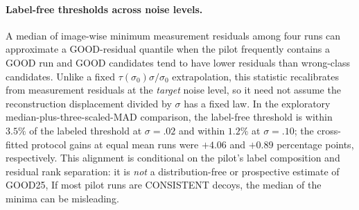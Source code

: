 \paragraph{Label-free thresholds across noise levels.}
A median of image-wise minimum measurement residuals among four
runs can approximate a GOOD-residual quantile when the pilot
frequently contains a GOOD run and GOOD candidates tend to have
lower residuals than wrong-class candidates. Unlike a fixed
$\tau(\sigma_0)\sigma/\sigma_0$ extrapolation, this statistic
recalibrates from measurement residuals at the \emph{target}
noise level, so it need not assume the reconstruction
displacement divided by $\sigma$ has a fixed law.
In the exploratory median-plus-three-scaled-MAD comparison, the
label-free threshold is within $3.5\%$ of the labeled threshold
at $\sigma=.02$ and within $1.2\%$ at $\sigma=.10$;
the cross-fitted protocol gains at equal mean runs were $+4.06$
and $+0.89$ percentage points, respectively.
This alignment is conditional on the pilot's label
composition and residual rank separation: it is \emph{not}
a distribution-free or prospective estimate of GOOD25,
If most pilot runs are CONSISTENT decoys, the
median of the minima can be misleading.
